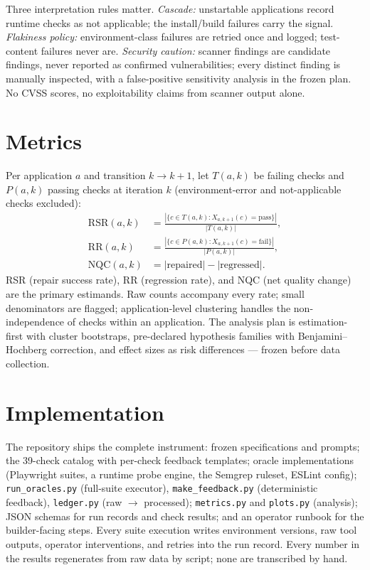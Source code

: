 \documentclass[conference]{IEEEtran}
\begin{document}
Three interpretation rules matter. \emph{Cascade:} unstartable applications record
runtime checks as not applicable; the install/build failures carry the signal.
\emph{Flakiness policy:} environment-class failures are retried once and logged;
test-content failures never are. \emph{Security caution:} scanner findings are
candidate findings, never reported as confirmed vulnerabilities; every distinct
finding is manually inspected, with a false-positive sensitivity analysis in the
frozen plan. No CVSS scores, no exploitability claims from scanner output alone.

\section{Metrics}
Per application $a$ and transition $k \to k{+}1$, let $T(a,k)$ be failing checks
and $P(a,k)$ passing checks at iteration $k$ (environment-error and
not-applicable checks excluded):
\begin{align}
\mathrm{RSR}(a,k) &= \frac{|\{c \in T(a,k): X_{a,k+1}(c)=\mathrm{pass}\}|}{|T(a,k)|}, \\
\mathrm{RR}(a,k) &= \frac{|\{c \in P(a,k): X_{a,k+1}(c)=\mathrm{fail}\}|}{|P(a,k)|}, \\
\mathrm{NQC}(a,k) &= |\mathrm{repaired}| - |\mathrm{regressed}|.
\end{align}
RSR (repair success rate), RR (regression rate), and NQC (net quality change)
are the primary estimands. Raw counts accompany every rate; small denominators
are flagged; application-level clustering handles the non-independence of checks
within an application. The analysis plan is estimation-first with cluster
bootstraps, pre-declared hypothesis families with Benjamini--Hochberg correction,
and effect sizes as risk differences --- frozen before data collection.

\section{Implementation}
The repository ships the complete instrument: frozen specifications and prompts;
the 39-check catalog with per-check feedback templates; oracle implementations
(Playwright suites, a runtime probe engine, the Semgrep ruleset, ESLint config);
\texttt{run\_oracles.py} (full-suite executor), \texttt{make\_feedback.py}
(deterministic feedback), \texttt{ledger.py} (raw $\to$ processed);
\texttt{metrics.py} and \texttt{plots.py} (analysis); JSON schemas for run
records and check results; and an operator runbook for the builder-facing steps.
Every suite execution writes environment versions, raw tool outputs, operator
interventions, and retries into the run record. Every number in the results
regenerates from raw data by script; none are transcribed by hand.
\end{document}
